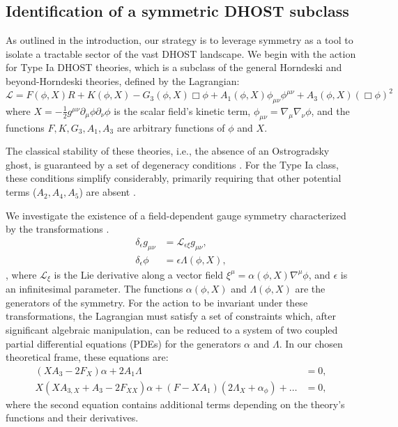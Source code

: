 \documentclass[twocolumn]{aastex631}
\begin{document}
\subsection{Identification of a symmetric DHOST subclass}
As outlined in the introduction, our strategy is to leverage symmetry as a tool to isolate a tractable sector of the vast DHOST landscape. We begin with the action for Type Ia DHOST theories, which is a subclass of the general Horndeski and beyond-Horndeski theories, defined by the Lagrangian:
\begin{equation}\mathcal{L} = F(\phi, X) R + K(\phi, X) - G_3(\phi, X) \Box\phi + A_1(\phi, X) \phi_{\mu\nu}\phi^{\mu\nu} + A_3(\phi, X) (\Box\phi)^2\end{equation}
where $X = - \frac{1}{2} g^{\mu\nu} \partial_\mu \phi \partial_\nu \phi$ is the scalar field's kinetic term, $\phi_{\mu\nu} = \nabla_\mu \nabla_\nu \phi$, and the functions $F, K, G_3, A_1, A_3$ are arbitrary functions of $\phi$ and $X$.

The classical stability of these theories, i.e., the absence of an Ostrogradsky ghost, is guaranteed by a set of degeneracy conditions \citep{crisostomi2017higherderivativefieldtheories,crisostomi2017higherderivativefieldtheories}. For the Type Ia class, these conditions simplify considerably, primarily requiring that other potential terms ($A_2, A_4, A_5$) are absent \citep{nezhad2025degeneratehigherorderscalartensortheories}.

We investigate the existence of a field-dependent gauge symmetry characterized by the transformations \citep{banerjee2000quantumgaugesymmetryfinite,upadhyay2012fielddependentnilpotentsymmetry,upadhyay2013finitefielddependentsymmetriesperturbative}.
\begin{align}\delta_\epsilon g_{\mu\nu} &= \mathcal{L}_{\epsilon \xi} g_{\mu\nu}, \\\delta_\epsilon \phi &= \epsilon \Lambda(\phi, X),\end{align}
\citep{popławski2024classicalphysicsspacetimefields,cranganore2025einsteinfieldsneuralperspective}, where $\mathcal{L}_{\xi}$ is the Lie derivative along a vector field $\xi^\mu = \alpha(\phi, X) \nabla^\mu \phi$, and $\epsilon$ is an infinitesimal parameter. The functions $\alpha(\phi, X)$ and $\Lambda(\phi, X)$ are the generators of the symmetry. For the action to be invariant under these transformations, the Lagrangian must satisfy a set of constraints which, after significant algebraic manipulation, can be reduced to a system of two coupled partial differential equations (PDEs) for the generators $\alpha$ and $\Lambda$. In our chosen theoretical frame, these equations are:
\begin{align}\left(X A_3 - 2 F_X\right) \alpha + 2 A_1 \Lambda &= 0, \label{eq:pde_one} \\X \left(X A_{3,X} + A_3 - 2 F_{XX}\right) \alpha + \left(F - X A_1 \right) \left(2 \Lambda_X + \alpha_\phi \right) + \dots &= 0, \label{eq:pde_two}\end{align}
where the second equation contains additional terms depending on the theory's functions and their derivatives.
\end{document}
